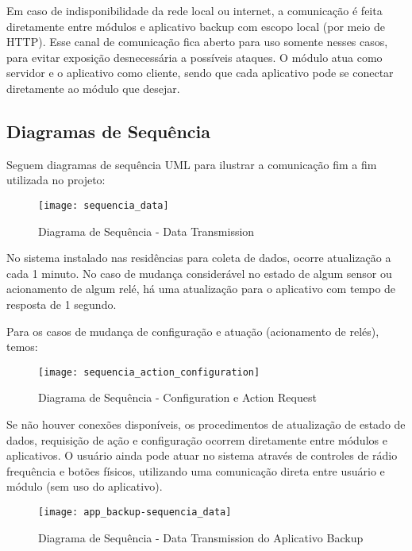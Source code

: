 Em caso de indisponibilidade da rede local ou internet, a comunicação é feita diretamente entre módulos e aplicativo backup com escopo local (por meio de HTTP). Esse canal de comunicação fica aberto para uso somente nesses casos, para evitar exposição desnecessária a possíveis ataques. O módulo atua como servidor e o aplicativo como cliente, sendo que cada aplicativo pode se conectar diretamente ao módulo que desejar.

\subsection{Diagramas de Sequência}

Seguem diagramas de sequência UML para ilustrar a comunicação fim a fim utilizada no projeto:

\begin{figure}[H]
	\centering
	\caption{Diagrama de Sequência - Data Transmission}
	\texttt{[image: sequencia\_data]}
	\label{fig:sequencia_data}
\end{figure}

No sistema instalado nas residências para coleta de dados, ocorre atualização a cada 1 minuto. No caso de mudança considerável no estado de algum sensor ou acionamento de algum relé, há uma atualização para o aplicativo com tempo de resposta de 1 segundo.

Para os casos de mudança de configuração e atuação (acionamento de relés), temos:

\begin{figure}[H]
	\centering
	\caption{Diagrama de Sequência - Configuration e Action Request}
	\texttt{[image: sequencia\_action\_configuration]}
	\label{fig:sequencia_action_configuration}
\end{figure}

Se não houver conexões disponíveis, os procedimentos de atualização de estado de dados, requisição de ação e configuração ocorrem diretamente entre módulos e aplicativos. O usuário ainda pode atuar no sistema através de controles de rádio frequência e botões físicos, utilizando uma comunicação direta entre usuário e módulo (sem uso do aplicativo).

\begin{figure}[H]
	\centering
	\caption{Diagrama de Sequência - Data Transmission do Aplicativo Backup}
	\texttt{[image: app\_backup-sequencia\_data]}
	\label{fig:app_backup-sequencia_data}
\end{figure}

